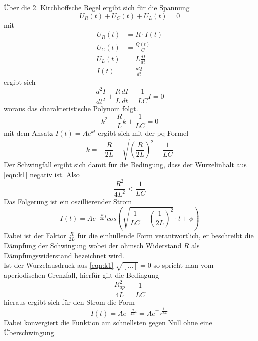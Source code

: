 Über die 2. Kirchhoffsche Regel ergibt sich für die Spannung
\begin{equation}
    U_R(t)+U_C(t)+U_L(t)=0
\end{equation}
mit
\begin{align*}
    U_R(t)&=R \cdot I(t)\\
    U_C(t)&=\frac{Q(t)}{C}\\
    U_L(t)&=L\frac{dI}{dt}\\
    I(t)&=\frac{dQ}{dt}
\end{align*}
ergibt sich
\begin{equation}
    \frac{d^2I}{dt^2}+\frac{R}{L}\frac{dI}{dt}+\frac{1}{LC}I=0
\end{equation}
woraus das charakteristische Polynom folgt.
\begin{equation}
    k^2+\frac{R}{L}k+\frac{1}{LC}=0
\end{equation}
mit dem Ansatz $I(t)=Ae^{kt}$ ergibt sich mit der pq-Formel
\begin{equation}
    k=-\frac{R}{2L} \pm \sqrt{(\frac{R}{2L})^2-\frac{1}{LC}}                          %
    \label{eqn:k1}
\end{equation}
Der Schwingfall ergibt sich damit für die Bedingung, dass der Wurzelinhalt 
aus \ref{eqn:k1} negativ ist. Also
\begin{equation}
    \frac{R^2}{4L^2}<\frac{1}{LC}
\end{equation}
Das Folgerung ist ein oszillierender Strom
\begin{equation}
    I(t)=Ae^{-\frac{R}{2L}t}cos\left(\sqrt{\frac{1}{LC}-(\frac{1}{2L})^2}\cdot t+\phi\right)
\end{equation} 
Dabei ist der Faktor $\frac{R}{2L}$ für die einhüllende Form verantwortlich,
er beschreibt die Dämpfung der Schwingung wobei der ohmsch Widerstand $R$ als 
Dämpfungswiderstand bezeichnet wird.\\

Ist der Wurzelausdruck aus \ref{eqn:k1} $\sqrt{[...]}=0$
so spricht man vom aperiodischen Grenzfall, hierfür gilt die Bedingung
\begin{equation}
    \frac{R_{ap}^2}{4L}=\frac{1}{LC}
\end{equation}
hieraus ergibt sich für den Strom die Form
\begin{equation}
    I(t)=Ae^{-\frac{R}{2L}t}=Ae^{-\frac{t}{\sqrt{LC}}}
    \label{eqn:efunktion}
\end{equation}
Dabei konvergiert die Funktion am schnellsten gegen Null ohne eine Überschwingung.\\\\

